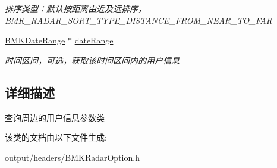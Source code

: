 \begin{DoxyCompactItemize}
\begin{DoxyCompactList}\small\item\em 排序类型：默认按距离由近及远排序，\+B\+M\+K\+\_\+\+R\+A\+D\+A\+R\+\_\+\+S\+O\+R\+T\+\_\+\+T\+Y\+P\+E\+\_\+\+D\+I\+S\+T\+A\+N\+C\+E\+\_\+\+F\+R\+O\+M\+\_\+\+N\+E\+A\+R\+\_\+\+T\+O\+\_\+\+F\+A\+R \end{DoxyCompactList}\item 
\hypertarget{interface_b_m_k_radar_nearby_search_option_afa2b58c57832f07cfb2e0a9f6dc13c79}{}\hyperlink{interface_b_m_k_date_range}{B\+M\+K\+Date\+Range} $\ast$ \hyperlink{interface_b_m_k_radar_nearby_search_option_afa2b58c57832f07cfb2e0a9f6dc13c79}{date\+Range}\label{interface_b_m_k_radar_nearby_search_option_afa2b58c57832f07cfb2e0a9f6dc13c79}

\begin{DoxyCompactList}\small\item\em 时间区间，可选，获取该时间区间内的用户信息 \end{DoxyCompactList}\end{DoxyCompactItemize}


\subsection{详细描述}
查询周边的用户信息参数类 

该类的文档由以下文件生成\+:\begin{DoxyCompactItemize}
\item 
output/headers/B\+M\+K\+Radar\+Option.\+h\end{DoxyCompactItemize}
